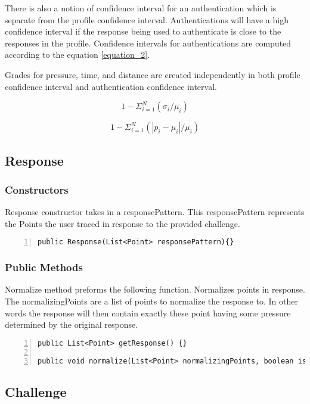 \documentclass{article} %
\begin{document}
There is also a notion of confidence interval for an authentication which is separate from the profile confidence interval.
Authentications will have a high confidence interval if the response being used to authenticate is close to the responses in the profile.
Confidence intervals for authentications are computed according to the equation \ref{equation_2}.

Grades for pressure, time, and distance are created independently in both profile confidence interval and authentication confidence interval.

\begin{equation}
\label{equation_1}
1 - \Sigma_{i=1}^N(\sigma_i/\mu_i)
\end{equation}

\begin{equation}
\label{equation_2}
1 - \Sigma_{i=1}^N(|p_i - \mu_i|/\mu_i)
\end{equation}

\subsection{Response}
\subsubsection{Constructors}
Response constructor takes in a responsePattern. This responsePattern represents the Points the user traced in response to the provided challenge.
\begin{lstlisting}[numbers=left]
public Response(List<Point> responsePattern){}
\end{lstlisting}

\subsubsection{Public Methods}
Normalize method preforms the following function. Normalizes points in response. The normalizingPoints are a list of points to normalize the response to. In other words the response will then contain exactly these point having some pressure determined by the original response.
\begin{lstlisting}[numbers=left]
public List<Point> getResponse() {}

public void normalize(List<Point> normalizingPoints, boolean isChallengeHorizontal) {}
\end{lstlisting}

\subsection{Challenge}
\end{document}
